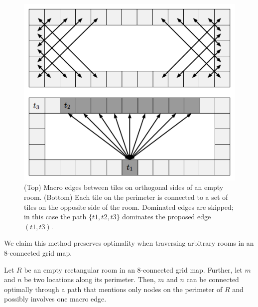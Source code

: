 \begin{figure}[tb]
       \begin{center}
                       \includegraphics[scale=0.5, trim = 10mm 10mm 10mm 0mm]{diagrams/macroedges.png}
       \end{center}
	\vspace{-3pt}
       \caption{(Top) Macro edges between tiles on orthogonal sides of an empty room. 
(Bottom) Each tile on the perimeter is connected to a set of tiles on the opposite side of the room.
Dominated edges are skipped; in this case the path $\lbrace t1, t2, t3 \rbrace$
dominates the proposed edge $(t1, t3)$.}
       \label{fig-macroedges}
\end{figure}
We claim this method preserves optimality when traversing arbitrary rooms in an 8-connected grid map.
\begin{lemma}
\label{lemma-rooms}
Let $R$ be an empty rectangular room in an 8-connected grid map.
Further, let $m$ and $n$ be two locations along its perimeter.
Then, $m$ and $n$ can be connected optimally through a path that mentions only nodes on the perimeter of $R$ and
possibly involves one macro edge.
\end{lemma}

